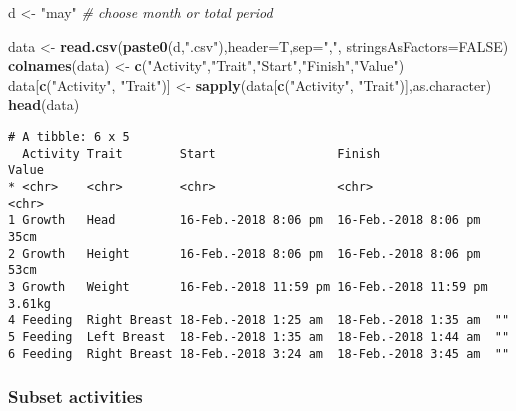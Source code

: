 \documentclass[10,portrait]{article}
\newenvironment{Shaded}{\begin{snugshade}}{\end{snugshade}}
\newcommand{\KeywordTok}[1]{\textcolor[rgb]{0.13,0.29,0.53}{\textbf{#1}}}
\newcommand{\DataTypeTok}[1]{\textcolor[rgb]{0.13,0.29,0.53}{#1}}
\newcommand{\StringTok}[1]{\textcolor[rgb]{0.31,0.60,0.02}{#1}}
\newcommand{\CommentTok}[1]{\textcolor[rgb]{0.56,0.35,0.01}{\textit{#1}}}
\newcommand{\OtherTok}[1]{\textcolor[rgb]{0.56,0.35,0.01}{#1}}
\newcommand{\OperatorTok}[1]{\textcolor[rgb]{0.81,0.36,0.00}{\textbf{#1}}}
\newcommand{\NormalTok}[1]{#1}
\begin{document}
\begin{Shaded}
\begin{Highlighting}[]
\NormalTok{d <-}\StringTok{ "may"} \CommentTok{# choose month or total period}

\NormalTok{data <-}\StringTok{ }\KeywordTok{read.csv}\NormalTok{(}\KeywordTok{paste0}\NormalTok{(d,}\StringTok{".csv"}\NormalTok{),}\DataTypeTok{header=}\NormalTok{T,}\DataTypeTok{sep=}\StringTok{","}\NormalTok{, }\DataTypeTok{stringsAsFactors=}\OtherTok{FALSE}\NormalTok{)}
\KeywordTok{colnames}\NormalTok{(data) <-}\StringTok{ }\KeywordTok{c}\NormalTok{(}\StringTok{"Activity"}\NormalTok{,}\StringTok{"Trait"}\NormalTok{,}\StringTok{"Start"}\NormalTok{,}\StringTok{"Finish"}\NormalTok{,}\StringTok{"Value"}\NormalTok{)}
\NormalTok{data[}\KeywordTok{c}\NormalTok{(}\StringTok{"Activity"}\NormalTok{, }\StringTok{"Trait"}\NormalTok{)] <-}\StringTok{ }\KeywordTok{sapply}\NormalTok{(data[}\KeywordTok{c}\NormalTok{(}\StringTok{"Activity"}\NormalTok{, }\StringTok{"Trait"}\NormalTok{)],as.character)}
\KeywordTok{head}\NormalTok{(data) }
\end{Highlighting}
\end{Shaded}

\begin{verbatim}
# A tibble: 6 x 5
  Activity Trait        Start                 Finish                Value 
* <chr>    <chr>        <chr>                 <chr>                 <chr> 
1 Growth   Head         16-Feb.-2018 8:06 pm  16-Feb.-2018 8:06 pm  35cm  
2 Growth   Height       16-Feb.-2018 8:06 pm  16-Feb.-2018 8:06 pm  53cm  
3 Growth   Weight       16-Feb.-2018 11:59 pm 16-Feb.-2018 11:59 pm 3.61kg
4 Feeding  Right Breast 18-Feb.-2018 1:25 am  18-Feb.-2018 1:35 am  ""    
5 Feeding  Left Breast  18-Feb.-2018 1:35 am  18-Feb.-2018 1:44 am  ""    
6 Feeding  Right Breast 18-Feb.-2018 3:24 am  18-Feb.-2018 3:45 am  ""    
\end{verbatim}

\subsubsection{Subset activities}\label{subset-activities}

\begin{Shaded}
\end{Shaded}
\end{document}
